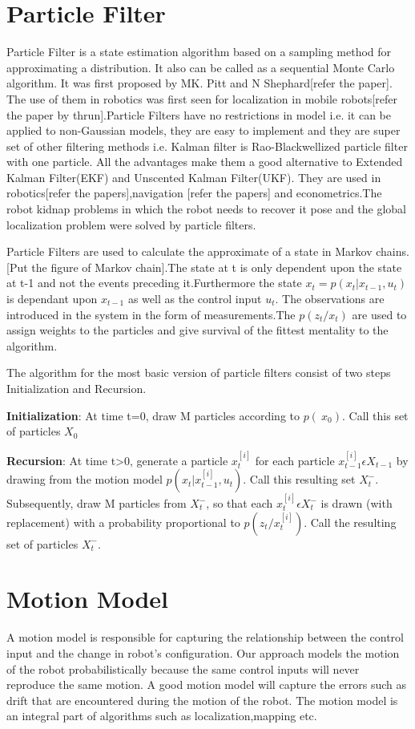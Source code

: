 \documentclass[12pt]{dalcsthesis}
\begin{document}
\section{Particle Filter}

Particle Filter is a state estimation algorithm based on a sampling method for approximating a distribution. It also can be called as a sequential Monte Carlo algorithm. It was first proposed by MK. Pitt and N Shephard[refer the paper]. The use of them in robotics was first seen for localization in mobile robots[refer the paper by thrun].Particle Filters have no restrictions in model i.e. it can be applied to non-Gaussian models, they are easy to implement and they are super set of other filtering methods i.e. Kalman filter is Rao-Blackwellized particle filter with one particle. All the advantages make them a good alternative to Extended Kalman Filter(EKF) and Unscented Kalman Filter(UKF). They are used in robotics[refer the papers],navigation [refer the papers] and econometrics.The robot kidnap problems in which the robot needs to recover it pose and the global localization problem were solved by particle filters. 


Particle Filters are used to calculate the approximate of a state in Markov chains.[Put the figure of Markov chain].The state at t is only dependent upon the state at t-1 and not the events preceding it.Furthermore the state $ x _{t}=p(x_{t}|x_{t-1},u _{t})$ is dependant upon $ x _{t-1}$ as well as the control input $u _{t}$. The observations are introduced in the system in the form of measurements.The $p(z_{t}/x_{t})$ are used to assign weights to the particles and give survival of the fittest mentality to the algorithm.  

The algorithm for the most basic version of particle filters consist of two steps Initialization and Recursion.

\textbf{Initialization}: At time t=0, draw M particles according to $p(~x _{0})$. Call this set of particles $X _{0}$

\textbf{Recursion}: At time t>0, generate a particle $x _{t} ^{[i]}$ for each particle $x _{t-1} ^{[i]} \epsilon X _{t-1}$ by drawing from the motion model $p(x_{t}|x_{t-1} ^{[i]},u _{t})$. Call this resulting set $X ^{-} _{t}$. Subsequently, draw M particles from $X ^{-} _{t}$, so that each $x _{t} ^{[i]} \epsilon X ^{-} _{t}$ is drawn (with replacement) with a probability  proportional to $p(z_{t}/x_{t} ^{[i]})$. Call the resulting set of particles $X ^{-} _{t}$. 


\section{Motion Model}
A motion model is responsible for capturing the relationship between
the control input and the change in robot's configuration. Our approach
models the motion of the robot probabilistically because the same
control inputs will never reproduce the same motion. A good motion
model will capture the errors such as drift that are encountered during
the motion of the robot. The motion model is an integral part of algorithms
such as localization,mapping etc. 
\end{document}
